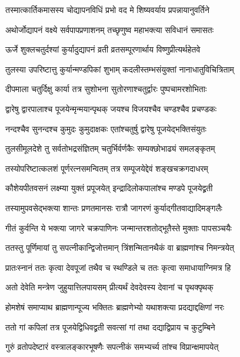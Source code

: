 \twolineshloka
{तस्मात्कार्तिकमासस्य चोद्यापनविधिं प्रभो}
{वद मे शिष्यवर्याय प्रपन्नायानुवर्तिने} %


\twolineshloka
{अथोर्जोद्यापनं वक्ष्ये सर्वपापप्रणाशनम्}
{तच्छृणुष्व महाभक्त्या सविधानं समासतः} %

\twolineshloka
{ऊर्जे शुक्लचतुर्दश्यां कुर्यादुद्यापनं व्रती}
{व्रतसम्पूरणार्थाय विष्णुप्रीत्यर्थहेतवे} %

\twolineshloka
{तुलस्या उपरिष्टात्तु कुर्यान्मण्डपिकां शुभाम्}
{कदलीस्तम्भसंयुक्तां नानाधातुविचित्रिताम्} %

\twolineshloka
{दीपमाला चतुर्दिक्षु कार्या तत्र सुशोभना}
{सुतोरणाश्चतुर्द्वारः पुष्पचामरशोभिताः} %

\twolineshloka
{द्वारेषु द्वारपालाश्च पूजयेन्मृन्मयान्पृथक्}
{जयश्च विजयश्चैव चण्डश्चैव प्रचण्डकः} %

\twolineshloka
{नन्दश्चैव सुनन्दश्च कुमुदः कुमुदाक्षकः}
{एतांश्चतुर्षु द्वारेषु पूजयेद्भक्तिसंयुतः} %

\twolineshloka
{तुलसीमूलदेशे तु सर्वतोभद्रसंज्ञितम्}
{चतुर्भिर्वर्णकैः सम्यक्छोभाढ्यं समलङ्कृतम्} %

\twolineshloka
{तस्योपरिष्टात्कलशं पूर्णरत्नसमन्वितम्}
{तत्र सम्पूजयेद्देवं शङ्खचक्रगदाधरम्} %

\twolineshloka
{कौशेयपीतवसनं लक्ष्म्या युक्तं प्रपूजयेत्}
{इन्द्रादिलोकपालांश्च मण्डपे पूजयेद्व्रती} %

\twolineshloka
{तस्यामुपवसेद्भक्त्या शान्तः प्रणतमानसः}
{रात्रौ जागरणं कुर्याद्गीतवाद्यादिमङ्गलैः} %

\twolineshloka
{गीतं कुर्वन्ति ये भक्त्या जागरे चक्रपाणिनः}
{जन्मान्तरशतोद्भूतैस्ते मुक्ताः पापसञ्चयैः} %

\twolineshloka
{ततस्तु पूर्णिमायां तु सपत्नीकान्द्विजोत्तमान्}
{त्रिंशन्मितानथैकं वा ब्राह्मणांश्च निमन्त्रयेत्} %

\twolineshloka
{प्रातःस्नानं ततः कृत्वा देवपूजां तथैव च}
{स्थण्डिले च ततः कृत्वा समाधायाग्निमत्र हि} %

\twolineshloka
{अतो देवेति मन्त्रेण जुहुयात्तिलपायसम्}
{प्रीत्यर्थं देवदेवस्य देवानां च पृथक्पृथक्} %

\twolineshloka
{होमशेषं समाप्याथ ब्राह्मणान्पूज्य भक्तितः}
{ब्राह्मणेभ्यो यथाशक्त्या प्रदद्याद्दक्षिणां नरः} %

\twolineshloka
{ततो गां कपिलां तत्र पूजयेद्विधिवद्व्रती}
{सवत्सां गां तथा दद्याद्विप्राय च कुटुम्बिने} %

\twolineshloka
{गुरुं व्रतोपदेष्टारं वस्त्रालङ्कारभूषणैः}
{सपत्नीकं समभ्यर्च्य तांश्च विप्रान्क्षमापयेत्} %

